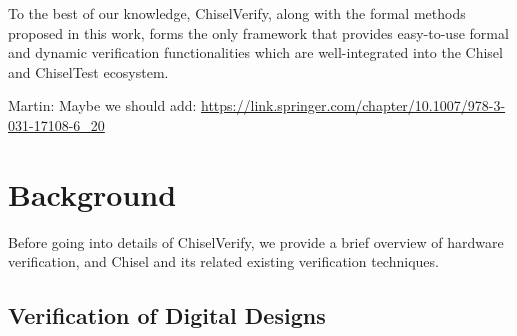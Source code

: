 \documentclass[conference]{IEEEtran}
\newcommand{\martin}[1]{{\color{blue} Martin: #1}}
\begin{document}

To the best of our knowledge, ChiselVerify, along with the formal methods proposed in this work, forms the only framework that provides easy-to-use formal and dynamic verification functionalities which are well-integrated into the Chisel and ChiselTest ecosystem.


\martin{Maybe we should add: \url{https://link.springer.com/chapter/10.1007/978-3-031-17108-6_20}}

\section{Background}
\label{sec:background}


Before going into details of ChiselVerify, we provide a brief overview of hardware verification, 
and Chisel and its related existing verification techniques.

\subsection{Verification of Digital Designs}
\end{document}
